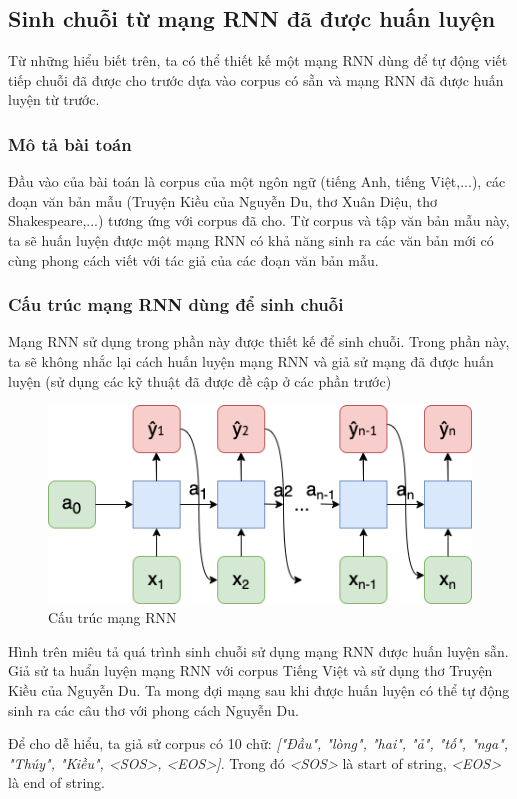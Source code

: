\subsection{Sinh chuỗi từ mạng RNN đã được huấn luyện}
\label{string generation using RNN}
Từ những hiểu biết trên, ta có thể thiết kế một mạng RNN dùng để tự động viết tiếp chuỗi đã được cho trước dựa vào corpus có sẵn và mạng RNN đã được huấn luyện từ trước.
\subsubsection{Mô tả bài toán}
Đầu vào của bài toán là corpus của một ngôn ngữ (tiếng Anh, tiếng Việt,...), các đoạn văn bản mẫu (Truyện Kiều của Nguyễn Du, thơ Xuân Diệu, thơ Shakespeare,...) tương ứng với corpus đã cho. Từ corpus và tập văn bản mẫu này, ta sẽ huấn luyện được một mạng RNN có khả năng sinh ra các văn bản mới có cùng phong cách viết với tác giả của các đoạn văn bản mẫu.

\subsubsection{Cấu trúc mạng RNN dùng để sinh chuỗi}
Mạng RNN sử dụng trong phần này được thiết kế để sinh chuỗi. Trong phần này, ta sẽ không nhắc lại cách huấn luyện mạng RNN và giả sử mạng đã được huấn luyện (sử dụng các kỹ thuật đã được đề cập ở các phần trước)

\begin{figure}[h!]
	\centering
		\includegraphics[width=0.7\columnwidth]{books/artificial-neural-network/chapter07/figure-sec3/rnn_network.png}
		\centering
	\caption{Cấu trúc mạng RNN}
	\label{fig:rnn_network}
\end{figure}

Hình trên miêu tả quá trình sinh chuỗi sử dụng mạng RNN được huấn luyện sẵn. Giả sử ta huẩn luyện mạng RNN với corpus Tiếng Việt và sử dụng thơ Truyện Kiều của Nguyễn Du. Ta mong đợi mạng sau khi được huấn luyện có thể tự động sinh ra các câu thơ với phong cách Nguyễn Du.

Để cho dễ hiểu, ta giả sử corpus có 10 chữ: \textit{["Đầu", "lòng", "hai", "ả", "tố", "nga", "Thúy", "Kiều", <SOS>, <EOS>]}. Trong đó \textit{<SOS>} là start of string, \textit{<EOS>} là end of string.

